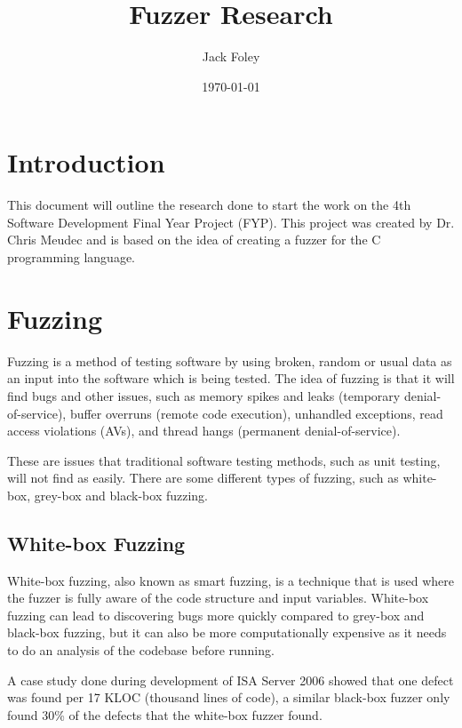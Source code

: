 \documentclass[a4paper,12pt]{article}
\title{Fuzzer Research}
\author{Jack Foley}
\date{\today}
\begin{document}
\maketitle

\newpage
{}
\tableofcontents

\newpage
{}

\section{Introduction}
This document will outline the research done to start the work on the 4th Software Development Final Year Project (FYP). This project was created by Dr. Chris Meudec and is based on the idea of creating a fuzzer for the C programming language.

\section{Fuzzing}
Fuzzing is a method of testing software by using broken, random or usual data as an input into the software which is being tested. The idea of fuzzing is that it will find bugs and other issues, such as memory spikes and leaks (temporary denial-of-service), buffer overruns (remote code execution), unhandled exceptions, read access violations (AVs), and thread hangs (permanent denial-of-service). 

These are issues that traditional software testing methods, such as unit testing, will not find as easily. There are some different types of fuzzing, such as white-box, grey-box and black-box fuzzing.\cite{neystadt2009}

\subsection{White-box Fuzzing}
White-box fuzzing, also known as smart fuzzing, is a technique that is used where the fuzzer is fully aware of the code structure and input variables. White-box fuzzing can lead to discovering bugs more quickly compared to grey-box and black-box fuzzing, but it can also be more computationally expensive as it needs to do an analysis of the codebase before running. 

A case study done during development of ISA Server 2006 showed that one defect was found per 17 KLOC (thousand lines of code), a similar black-box fuzzer only found 30\% of the defects that the white-box fuzzer found.\cite{neystadt2009}
\end{document}
